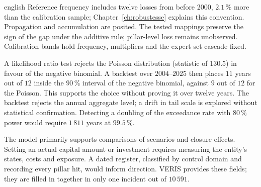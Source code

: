 \begin{otherlanguage*}{english}
Reference frequency includes twelve losses from before 2000, $2.1\,\%$ more than
the calibration sample; Chapter~\ref{ch:robustesse} explains this convention.
Propagation and accumulation are posited. The tested mappings preserve the sign of the gap under
the additive rule; pillar-level loss remains unobserved. Calibration bands hold frequency,
multipliers and the expert-set cascade fixed.

A likelihood ratio test rejects the Poisson distribution (statistic of $130.5$) in favour of the
negative binomial. A backtest over $2004$--$2025$ then places $11$ years out of
$12$ inside the $90\,\%$ interval of the negative binomial, against $9$ out of $12$ for the Poisson.
This supports the choice without proving it over twelve years. The backtest rejects the annual aggregate level; a drift in tail scale is explored without statistical confirmation. Detecting a doubling of the exceedance rate with $80\,\%$ power would require $1\,811$ years at $99.5\,\%$.

The model primarily supports comparisons of scenarios and closure effects. Setting an actual
capital amount or investment requires measuring the entity's states, costs and exposure.
A dated register, classified by control domain and recording every pillar hit, would inform
direction. VERIS provides these fields; they are filled in together in only one incident out of
$10\,591$.
\end{otherlanguage*}
